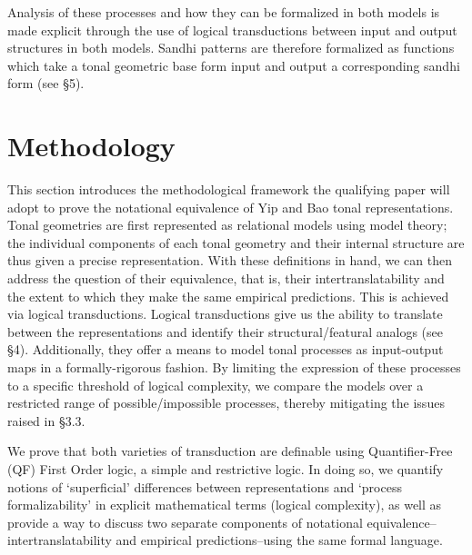 \documentclass{article}
\begin{document}
Analysis of these processes and how they can be formalized in both models is made explicit through the use of logical transductions between input and output structures in both models. Sandhi patterns are therefore formalized as functions which take a tonal geometric base form input and output a corresponding sandhi form (see \S 5).
\section{Methodology}
This section introduces the methodological framework the qualifying paper will adopt to prove the notational equivalence of Yip and Bao tonal representations. Tonal geometries are first represented as relational models using model theory; the individual components of each tonal geometry and their internal structure are thus given a precise representation. With these definitions in hand, we can then address the question of their equivalence, that is, their intertranslatability and the extent to which they make the same empirical predictions. This is achieved via logical transductions. Logical transductions give us the ability to translate between the representations and identify their structural/featural analogs (see \S4). Additionally, they offer a means to model tonal processes as input-output maps in a formally-rigorous fashion. By limiting the expression of these processes to a specific threshold of logical complexity, we compare the models over a restricted range of possible/impossible processes, thereby mitigating the issues raised in \S3.3. \par
We prove that both varieties of transduction are definable using Quantifier-Free (QF) First Order logic, a simple and restrictive logic. In doing so, we quantify notions of `superficial' differences between representations and `process formalizability' in explicit mathematical terms (logical complexity), as well as provide a way to discuss two separate components of notational equivalence--intertranslatability and empirical predictions--using the same formal language.
\end{document}
